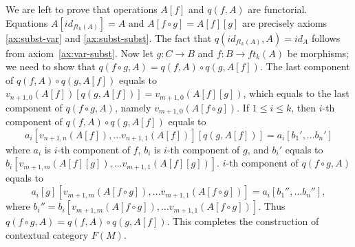 \documentclass[reqno]{amsart}
\theoremstyle{definition}
\theoremstyle{remark}
\numberwithin{figure}{section}
\begin{document}
We are left to prove that operations $A[f]$ and $q(f,A)$ are functorial.
Equations $A[id_{ft_k(A)}] = A$ and $A[f \circ g] = A[f][g]$ are precisely axioms \eqref{ax:subst-var} and \eqref{ax:subst-subst}.
The fact that $q(id_{ft_k(A)}, A) = id_A$ follows from axiom~\ref{ax:var-subst}.
Now let $g : C \to B$ and $f : B \to ft_k(A)$ be morphisms; we need to show that $q(f \circ g, A) = q(f,A) \circ q(g,A[f])$.
The last component of $q(f,A) \circ q(g,A[f])$ equals to $v_{n+1,0}(A[f])[q(g,A[f])] = v_{m+1,0}(A[f][g])$,
    which equals to the last component of $q(f \circ g, A)$, namely $v_{m+1,0}(A[f \circ g])$.
If $1 \leq i \leq k$, then $i$-th component of $q(f,A) \circ q(g,A[f])$ equals to
\[ a_i[v_{n+1,n}(A[f]), \ldots v_{n+1,1}(A[f])][q(g,A[f])] = a_i[b_1', \ldots b_n'] \]
where $a_i$ is $i$-th component of $f$, $b_i$ is $i$-th component of $g$, and $b_i'$ equals to $b_i[v_{m+1,m}(A[f][g]), \ldots v_{m+1,1}(A[f][g])]$.
$i$-th component of $q(f \circ g, A)$ equals to
\[ a_i[g][v_{m+1,m}(A[f \circ g]), \ldots v_{m+1,1}(A[f \circ g])] = a_i[b_1'', \ldots b_n''], \]
where $b_i'' = b_i[v_{m+1,m}(A[f \circ g]), \ldots v_{m+1,1}(A[f \circ g])]$.
Thus $q(f \circ g, A) = q(f,A) \circ q(g,A[f])$.
This completes the construction of contextual category $F(M)$.
\end{document}
